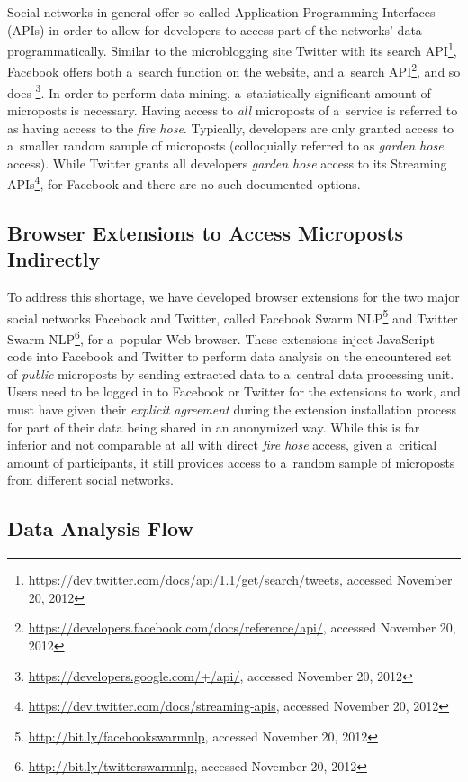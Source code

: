 Social networks in general offer so-called
Application Programming Interfaces (APIs)
in order to allow for developers to access
part of the networks' data programmatically.
Similar to the microblogging site Twitter
with its search
API\footnote{\url{https://dev.twitter.com/docs/api/1.1/get/search/tweets},
accessed November 20, 2012},
Facebook offers both a~search function on the website,
and a~search
API\footnote{\url{https://developers.facebook.com/docs/reference/api/},
accessed November 20, 2012},
and so does
\googleplus\footnote{\url{https://developers.google.com/+/api/},
accessed November 20, 2012}.
In order to perform data mining,
a~statistically significant amount of microposts is necessary.
Having access to \emph{all} microposts of a~service is referred to as
having access to the \emph{fire hose}.
Typically, developers are only granted access to a~smaller random 
sample of microposts (colloquially referred to as \emph{garden hose} access).
While Twitter grants all developers \emph{garden hose} access to its Streaming
APIs\footnote{\url{https://dev.twitter.com/docs/streaming-apis},
accessed November 20, 2012},
for Facebook and \googleplus there are no such documented options.

\subsection{Browser Extensions to Access Microposts Indirectly}

To address this shortage, we have developed browser extensions
for the two major social networks Facebook and Twitter,
called Facebook Swarm
NLP\footnote{\url{http://bit.ly/facebookswarmnlp},
accessed November 20, 2012}
and Twitter Swarm
NLP\footnote{\url{http://bit.ly/twitterswarmnlp},
accessed November 20, 2012},
for a~popular Web browser.
These extensions inject JavaScript code into Facebook and
Twitter to perform data analysis on the encountered set of
\emph{public} microposts by sending extracted data
to a~central data processing unit.
Users need to be logged in to Facebook or Twitter for the 
extensions to work, and must have given
their \emph{explicit agreement} during
the extension installation process
for part of their data being shared in an anonymized way.
While this is far inferior and not comparable at all
with direct \emph{fire hose} access,
given a~critical amount of participants,
it still provides access to a~random sample of microposts
from different social networks.

\subsection{Data Analysis Flow}

